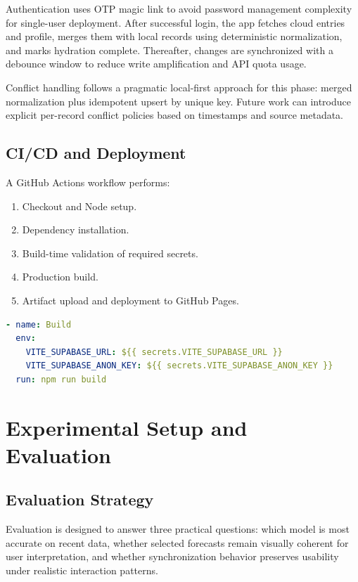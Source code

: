 \documentclass[12pt,a4paper]{report}
\begin{document}
Authentication uses OTP magic link to avoid password management complexity for single-user deployment. After successful login, the app fetches cloud entries and profile, merges them with local records using deterministic normalization, and marks hydration complete. Thereafter, changes are synchronized with a debounce window to reduce write amplification and API quota usage.

Conflict handling follows a pragmatic local-first approach for this phase: merged normalization plus idempotent upsert by unique key. Future work can introduce explicit per-record conflict policies based on timestamps and source metadata.

\section{CI/CD and Deployment}
A GitHub Actions workflow performs:
\begin{enumerate}[label=\arabic*.]
  \item Checkout and Node setup.
  \item Dependency installation.
  \item Build-time validation of required secrets.
  \item Production build.
  \item Artifact upload and deployment to GitHub Pages.
\end{enumerate}

\begin{lstlisting}[language=yaml,caption={Excerpt of deployment workflow with Supabase secret injection}]
- name: Build
  env:
    VITE_SUPABASE_URL: ${{ secrets.VITE_SUPABASE_URL }}
    VITE_SUPABASE_ANON_KEY: ${{ secrets.VITE_SUPABASE_ANON_KEY }}
  run: npm run build
\end{lstlisting}

\chapter{Experimental Setup and Evaluation}
\section{Evaluation Strategy}
Evaluation is designed to answer three practical questions: which model is most accurate on recent data, whether selected forecasts remain visually coherent for user interpretation, and whether synchronization behavior preserves usability under realistic interaction patterns.
\end{document}
